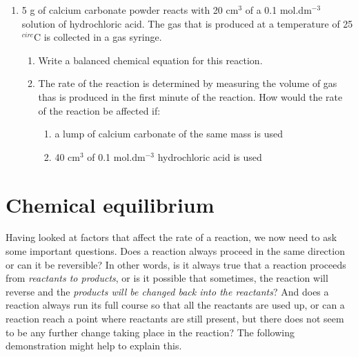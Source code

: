 {\begin{enumerate}
\item{5 g of calcium carbonate powder reacts with 20 cm$^{3}$ of a 0.1 mol.dm$^{-3}$ solution of hydrochloric acid. The gas that is produced at a temperature of 25$^{circ}$C is collected in a gas syringe.}
	\begin{enumerate}
	\item{Write a balanced chemical equation for this reaction.}
	\item{The rate of the reaction is determined by measuring the volume of gas thas is produced in the first minute of the reaction. How would the rate of the reaction be affected if:}
		\begin{enumerate}
		\item{a lump of calcium carbonate of the same mass is used}
		\item{40 cm$^{3}$ of 0.1 mol.dm$^{-3}$ hydrochloric acid is used}
		\end{enumerate} 
	\end{enumerate}

\end{enumerate}
}







\section{Chemical equilibrium}
\label{sec:reactionrates:equilibrium}

Having looked at factors that affect the rate of a reaction, we now need to ask some important questions. Does a reaction always proceed in the same direction or can it be reversible? In other words, is it always true that a reaction proceeds from \textit{reactants to products}, or is it possible that sometimes, the reaction will reverse and the \textit{products will be changed back into the reactants}? And does a reaction always run its full course so that all the reactants are used up, or can a reaction reach a point where reactants are still present, but there does not seem to be any further change taking place in the reaction? The following demonstration might help to explain this.

